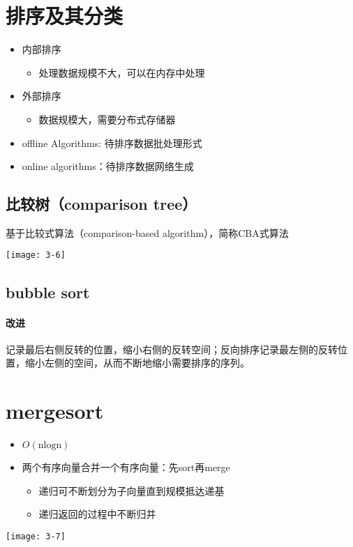 \section{排序及其分类}
\begin{itemize}
\item 内部排序
\begin{itemize}
\item 处理数据规模不大，可以在内存中处理
\end{itemize}
\item 外部排序
\begin{itemize}
\item 数据规模大，需要分布式存储器
\end{itemize}
\item offline Algorithms: 待排序数据批处理形式
\item online algorithms：待排序数据网络生成
\end{itemize}

\subsection{比较树（comparison tree）}
基于比较式算法（comparison-based algorithm），简称CBA式算法

\texttt{[image: 3-6]}

\subsection{bubble sort}
\paragraph{改进}
记录最后右侧反转的位置，缩小右侧的反转空间；反向排序记录最左侧的反转位置，缩小左侧的空间，从而不断地缩小需要排序的序列。

\section{mergesort}
\begin{itemize}
\item $O(\mathrm{nlogn})$
\item 两个有序向量合并一个有序向量：先sort再merge
\begin{itemize}
\item 递归可不断划分为子向量直到规模抵达递基
\item 递归返回的过程中不断归并
\end{itemize}
\end{itemize}
\texttt{[image: 3-7]}

